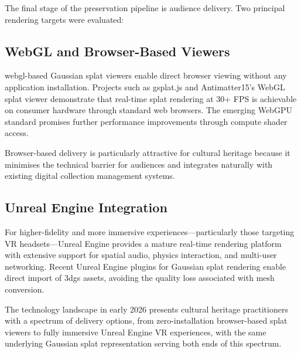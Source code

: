The final stage of the preservation pipeline is audience delivery. Two principal rendering targets were evaluated:

\subsection{WebGL and Browser-Based Viewers}

\acrshort{webgl}-based Gaussian splat viewers enable direct browser viewing without any application installation. Projects such as gsplat.js and Antimatter15's WebGL splat viewer demonstrate that real-time splat rendering at 30+ FPS is achievable on consumer hardware through standard web browsers. The emerging WebGPU standard promises further performance improvements through compute shader access.

Browser-based delivery is particularly attractive for cultural heritage because it minimises the technical barrier for audiences and integrates naturally with existing digital collection management systems.

\subsection{Unreal Engine Integration}

For higher-fidelity and more immersive experiences---particularly those targeting VR headsets---Unreal Engine provides a mature real-time rendering platform with extensive support for spatial audio, physics interaction, and multi-user networking. Recent Unreal Engine plugins for Gaussian splat rendering enable direct import of \acrshort{3dgs} assets, avoiding the quality loss associated with mesh conversion.

\begin{keyfinding}
The technology landscape in early 2026 presents cultural heritage practitioners with a spectrum of delivery options, from zero-installation browser-based splat viewers to fully immersive Unreal Engine VR experiences, with the same underlying Gaussian splat representation serving both ends of this spectrum.
\end{keyfinding}
